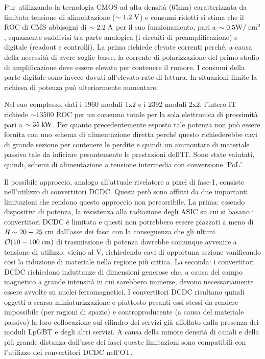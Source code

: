 
Pur utilizzando la tecnologia CMOS ad alta densit\`a (65nm) caratterizzata da limitata tensione di alimentazione ($\sim 1.2\rm \; V$) e consumi ridotti si stima che il ROC di CMS abbisogni di $\sim 2.2\rm \; A$ per il suo funzionamento, pari a $\sim 0.5{\mathrm W}/\rm \; cm^2$, equamente suddivisi tra parte analogica (i circuiti di preamplificazione) e digitale (readout e controlli). La prima richiede elevate correnti perch\'e, a causa della necessit\`a di avere soglie basse, la corrente di polarizzazione del primo stadio di amplificazione deve essere elevata per contenere il rumore. I consumi della parte digitale sono invece dovuti all'elevato rate di lettura. In situazioni limite la richiesa di potenza pu\`o ulteriormente aumentare.

Nel suo complesso, dati i 1960 moduli 1x2 e i 2392 moduli 2x2, l'intero IT richiede $\sim13500$ ROC per un consumo totale per la sola elettronica di prossimit\`a pari a $\sim 35\rm \; kW$. Per quanto precedentemente esposto tale potenza non pu\`o essere fornita con uno schema di alimentazione diretta perch\'e questo richiederebbe cavi di grande sezione per contenere le perdite e quindi un ammontare di materiale passivo tale da inficiare pesantemente le prestazioni dell'IT. Sono state valutati, quindi, schemi di alimentazione a tensione intermedia con conversione `PoL'.

Il possibile approccio, analogo all'attuale rivelatore a pixel di fase-1, consiste nell'utilizzo di convertitori DCDC. Questi per\`o sono afflitti da due importanti limitazioni che rendono questo approccio non percorribile. La prima: essendo dispositivi di potenza, la resistenza alla radiazione degli ASIC su cui si basano i convertitori DCDC \`e limitata e questi non potrebbero essere piazzati a meno di $R\sim20-25\rm \; cm$ dall'asse dei fasci con la conseguenza che gli ultimi ${\cal O}(10-100\rm \; cm)$ di trasmissione di potenza dovrebbe comunque avvenire a tensione di utilizzo, vicino al V, richiedendo cavi di opportuna sezione vanificando cos\`i la riduzione di materiale nella regione pi\`u critica. La seconda: i convertitori DCDC richiedono induttanze di dimensioni generose che, a causa del campo magnetico a grande intensit\`a in cui sarebbero immerse, devono necessariamente essere avvolte su nuclei ferromagnetici. I convertitori DCDC risultano quindi oggetti a scarsa miniaturizzazione e piuttosto pesanti essi stessi da rendere impossibile (per ragioni di spazio) e controproducente (a causa del materiale passivo) la loro collocazione sul cilindro dei servizi gi\`a affollato dalla presenza dei moduli LpGBT e degli altri servizi. A causa della minore densit\`a di canali e della pi\`u grande distanza dall'asse dei fasci queste limitazioni sono compatibili con l'utilizzo dei convertitori DCDC nell'OT.

